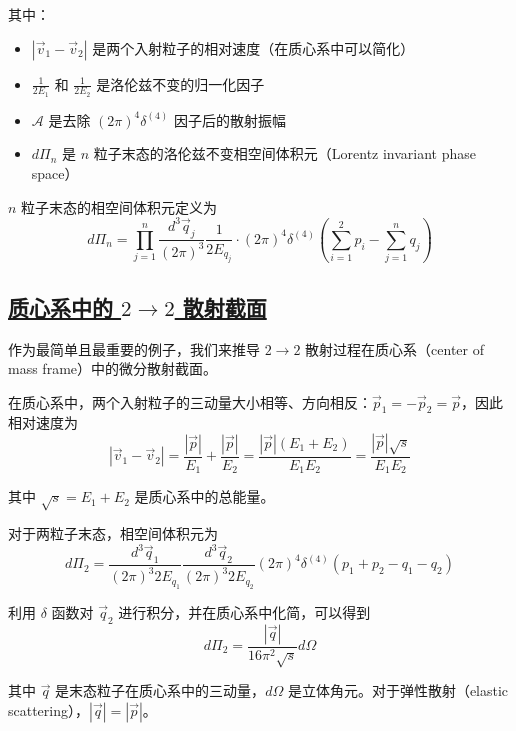 其中：
\begin{itemize}
    \item $|\vec{v}_1 - \vec{v}_2|$ 是两个入射粒子的相对速度（在质心系中可以简化）
    \item $\displaystyle \frac{1}{2E_1}$ 和 $\displaystyle \frac{1}{2E_2}$ 是洛伦兹不变的归一化因子
    \item $\mathcal{A}$ 是去除 $(2\pi)^4\delta^{(4)}$ 因子后的散射振幅
    \item $d\Pi_n$ 是 $n$ 粒子末态的洛伦兹不变相空间体积元（Lorentz invariant phase space）
\end{itemize}

$n$ 粒子末态的相空间体积元定义为
\begin{equation}
    d\Pi_n = \prod_{j=1}^{n} \frac{d^3 \vec{q}_j}{(2\pi)^3} \frac{1}{2E_{q_j}} \cdot (2\pi)^4\delta^{(4)}\left(\sum_{i=1}^{2} p_i - \sum_{j=1}^{n} q_j\right)
\end{equation}

\subsection{\protect\hyperlink{:}{质心系中的 $2 \to 2$ 散射截面}}

作为最简单且最重要的例子，我们来推导 $2 \to 2$ 散射过程在质心系（center of mass frame）中的微分散射截面。

在质心系中，两个入射粒子的三动量大小相等、方向相反：$\vec{p}_1 = -\vec{p}_2 = \vec{p}$，因此相对速度为
\begin{equation}
    |\vec{v}_1 - \vec{v}_2| = \frac{|\vec{p}|}{E_1} + \frac{|\vec{p}|}{E_2} = \frac{|\vec{p}|(E_1 + E_2)}{E_1 E_2} = \frac{|\vec{p}|\sqrt{s}}{E_1 E_2}
\end{equation}

其中 $\sqrt{s} = E_1 + E_2$ 是质心系中的总能量。

对于两粒子末态，相空间体积元为
\begin{equation}
    d\Pi_2 = \frac{d^3 \vec{q}_1}{(2\pi)^3 2E_{q_1}} \frac{d^3 \vec{q}_2}{(2\pi)^3 2E_{q_2}} (2\pi)^4\delta^{(4)}(p_1 + p_2 - q_1 - q_2)
\end{equation}

利用 $\delta$ 函数对 $\vec{q}_2$ 进行积分，并在质心系中化简，可以得到
\begin{equation}
    d\Pi_2 = \frac{|\vec{q}|}{16\pi^2 \sqrt{s}} d\Omega
\end{equation}

其中 $\vec{q}$ 是末态粒子在质心系中的三动量，$d\Omega$ 是立体角元。对于弹性散射（elastic scattering），$|\vec{q}| = |\vec{p}|$。

